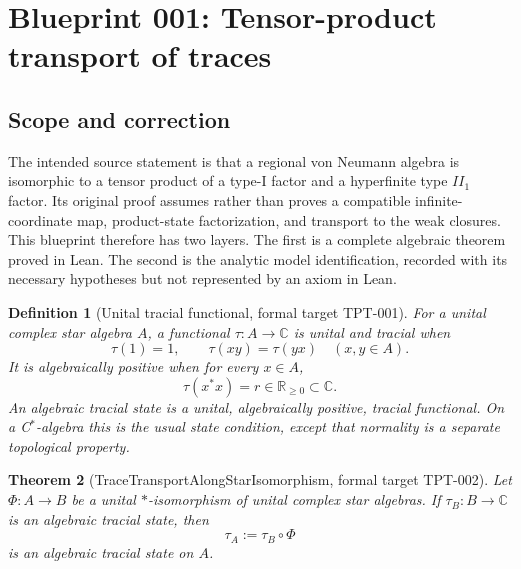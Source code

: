 \documentclass{article}
\newtheorem{definition}{Definition}
\newtheorem{theorem}[definition]{Theorem}
\begin{document}
\section*{Blueprint 001: Tensor-product transport of traces}

\subsection*{Scope and correction}

The intended source statement is that a regional von Neumann algebra is
isomorphic to a tensor product of a type-I factor and a hyperfinite type
\(II_1\) factor.  Its original proof assumes rather than proves a compatible
infinite-coordinate map, product-state factorization, and transport to the
weak closures.  This blueprint therefore has two layers.  The first is a
complete algebraic theorem proved in Lean.  The second is the analytic model
identification, recorded with its necessary hypotheses but not represented by
an axiom in Lean.

\begin{definition}[Unital tracial functional, formal target TPT-001]
For a unital complex star algebra \(A\), a functional \(\tau:A\to\mathbb C\)
is unital and tracial when
\begin{equation*}
  \tau(1)=1,
  \qquad
  \tau(xy)=\tau(yx)\quad (x,y\in A).
\end{equation*}
It is algebraically positive when for every \(x\in A\),
\begin{equation*}
  \tau(x^*x)=r\in\mathbb R_{\geq0}\subset\mathbb C.
\end{equation*}
An \emph{algebraic tracial state} is a unital, algebraically positive,
tracial functional.  On a C\(^*\)-algebra this is the usual state condition,
except that normality is a separate topological property.
\end{definition}

\begin{theorem}[TraceTransportAlongStarIsomorphism, formal target TPT-002]
Let \(\Phi:A\to B\) be a unital \(*\)-isomorphism of unital complex star
algebras.  If \(\tau_B:B\to\mathbb C\) is an algebraic tracial state, then
\begin{equation*}
  \tau_A:=\tau_B\circ\Phi
\end{equation*}
is an algebraic tracial state on \(A\).
\end{theorem}
\end{document}
